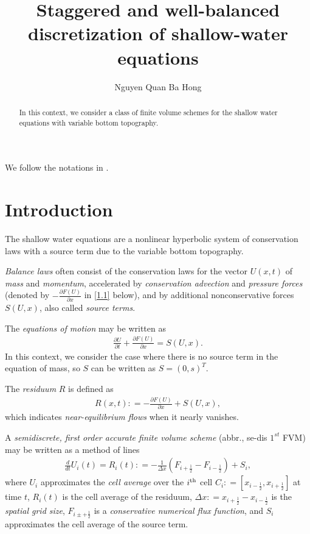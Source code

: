 \documentclass[11pt,a4paper,center,notitlepage]{article}
\title{Staggered and well-balanced discretization of shallow-water equations}
\author{Nguyen Quan Ba Hong}
\numberwithin{equation}{section}
\begin{document}
\maketitle
\begin{abstract}
In this context, we consider a class of finite volume schemes for the shallow water equations with variable bottom topography.
\end{abstract}

\maketitle
\tableofcontents

We follow the notations in \cite{Duchene2019}. 
\section{Introduction}
The shallow water equations are a nonlinear hyperbolic system of conservation laws with a source term due to the variable bottom topography. 

\textit{Balance laws} often consist of the conservation laws for the vector $U\left(x,t\right)$ of \textit{mass} and \textit{momentum}, accelerated by \textit{conservation advection} and \textit{pressure forces} (denoted by $ - \frac{{\partial F\left( U \right)}}{{\partial x}}$ in \eqref{1.1} below), and by additional nonconservative forces $S\left(U,x\right)$, also called \textit{source terms}. 

The \textit{equations of motion} may be written as
\begin{align}
\label{1.1}
\frac{{\partial U}}{{\partial t}} + \frac{{\partial F\left( U \right)}}{{\partial x}} = S\left( {U,x} \right).
\end{align}
In this context, we consider the case where there is no source term in the equation of mass, so $S$ can be written as $S =\left(0,s\right)^T$.

The \textit{residuum} $R$ is defined as
\begin{align}
R\left( {x,t} \right): =  - \frac{{\partial F\left( U \right)}}{{\partial x}} + S\left( {U,x} \right),
\end{align}
which indicates \textit{near-equilibrium flows} when it nearly vanishes.

A \textit{semidiscrete, first order accurate finite volume scheme} (abbr., se-dis $1^{st}$ FVM) may be written as a method of lines
\begin{align}
\label{1.3}
\frac{d}{{dt}}{U_i}\left( t \right) = {R_i}\left( t \right): =  - \frac{1}{{\Delta x}}\left( {{F_{i + \frac{1}{2}}} - {F_{i - \frac{1}{2}}}} \right) + {S_i},
\end{align}
where $U_i$ approximates the \textit{cell average} over the $i^{\rm th}$ cell ${C_i}: = \left[ {{x_{i - \frac{1}{2}}},{x_{i + \frac{1}{2}}}} \right]$ at time $t$, $R_i\left(t\right)$ is the cell average of the residuum, $\Delta x: = {x_{i + \frac{1}{2}}} - {x_{i - \frac{1}{2}}}$ is the \textit{spatial grid size}, $F_{i\pm +\frac{1}{2}}$ is a \textit{conservative numerical flux function}, and $S_i$ approximates the cell average of the source term.
\end{document}
